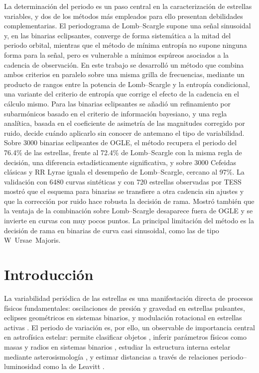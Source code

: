 \documentclass[12pt,letterpaper,oneside]{book}
\begin{document}
La determinaci\'on del periodo es un paso central en la caracterizaci\'on de estrellas variables, y dos de los m\'etodos m\'as empleados para ello presentan debilidades complementarias. El periodograma de Lomb--Scargle supone una se\~nal sinusoidal y, en las binarias eclipsantes, converge de forma sistem\'atica a la mitad del periodo orbital, mientras que el m\'etodo de m\'inima entrop\'ia no supone ninguna forma para la se\~nal, pero es vulnerable a m\'inimos esp\'ureos asociados a la cadencia de observaci\'on. En este trabajo se desarroll\'o un m\'etodo que combina ambos criterios en paralelo sobre una misma grilla de frecuencias, mediante un producto de rangos entre la potencia de Lomb--Scargle y la entrop\'ia condicional, una variante del criterio de entrop\'ia que corrige el efecto de la cadencia en el c\'alculo mismo. Para las binarias eclipsantes se a\~nadi\'o un refinamiento por subarm\'onicos basado en el criterio de informaci\'on bayesiano, y una regla anal\'itica, basada en el coeficiente de asimetr\'ia de las magnitudes corregido por ruido, decide cu\'ando aplicarlo sin conocer de antemano el tipo de variabilidad. Sobre 3000 binarias eclipsantes de OGLE, el m\'etodo recupera el periodo del 76.4\% de las estrellas, frente al 72.4\% de Lomb--Scargle con la misma regla de decisi\'on, una diferencia estad\'isticamente significativa, y sobre 3000 Cefeidas cl\'asicas y RR Lyrae iguala el desempe\~no de Lomb--Scargle, cercano al 97\%. La validaci\'on con 6480 curvas sint\'eticas y con 720 estrellas observadas por TESS mostr\'o que el esquema para binarias se transfiere a otra cadencia sin ajustes y que la correcci\'on por ruido hace robusta la decisi\'on de rama. Mostr\'o tambi\'en que la ventaja de la combinaci\'on sobre Lomb--Scargle desaparece fuera de OGLE y se invierte en curvas con muy pocos puntos. La principal limitaci\'on del m\'etodo es la decisi\'on de rama en binarias de curva casi sinusoidal, como las de tipo W~Ursae~Majoris.

\mainmatter

\tableofcontents

\newpage

\listoffigures
\listoftables

\newpage

\chapter{Introducci\'on}
\label{ch:introduccion}

La variabilidad peri\'odica de las estrellas es una manifestaci\'on directa de procesos f\'isicos fundamentales: oscilaciones de presi\'on y gravedad en estrellas pulsantes, eclipses geom\'etricos en sistemas binarios, y modulaci\'on rotacional en estrellas activas \citep{Karttunen2016,Carroll2017}. El periodo de variaci\'on es, por ello, un observable de importancia central en astrof\'isica estelar: permite clasificar objetos \citep{SanchezSaez2021}, inferir par\'ametros f\'isicos como masas y radios en sistemas binarios \citep{Karttunen2016}, estudiar la estructura interna estelar mediante asterosismolog\'ia \citep{Carroll2017}, y estimar distancias a trav\'es de relaciones periodo--luminosidad como la de Leavitt \citep{Ngeow_Gieren_Klein_2013}.
\end{document}
